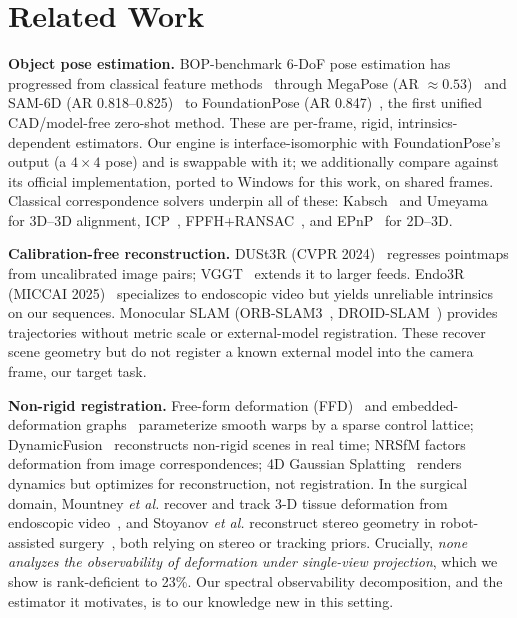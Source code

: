 \documentclass[9pt,twoside,web]{ieeecolor2}
\begin{document}
\section{Related Work}\label{sec:related}

\textbf{Object pose estimation.} BOP-benchmark 6-DoF pose estimation has progressed from classical feature methods~\cite{hodan2018bop} through MegaPose (AR $\approx0.53$)~\cite{labbe2022megapose} and SAM-6D (AR 0.818--0.825)~\cite{lin2024sam6d} to FoundationPose (AR 0.847)~\cite{wen2024foundationpose}, the first unified CAD/model-free zero-shot method. These are per-frame, rigid, intrinsics-dependent estimators. Our engine is interface-isomorphic with FoundationPose's output (a $4\times4$ pose) and is swappable with it; we additionally compare against its official implementation, ported to Windows for this work, on shared frames. Classical correspondence solvers underpin all of these: Kabsch~\cite{kabsch1976} and Umeyama~\cite{umeyama1991} for 3D--3D alignment, ICP~\cite{besl1992icp}, FPFH+RANSAC~\cite{rusu2009fpfh,fischler1981ransac}, and EPnP~\cite{lepetit2009epnp} for 2D--3D.

\textbf{Calibration-free reconstruction.} DUSt3R (CVPR 2024)~\cite{wang2024dust3r} regresses pointmaps from uncalibrated image pairs; VGGT~\cite{wang2025vggt} extends it to larger feeds. Endo3R (MICCAI 2025)~\cite{guo2025endo3r} specializes to endoscopic video but yields unreliable intrinsics on our sequences. Monocular SLAM (ORB-SLAM3~\cite{campos2021orbslam3}, DROID-SLAM~\cite{teed2021droidslam}) provides trajectories without metric scale or external-model registration. These recover scene geometry but do not register a known external model into the camera frame, our target task.

\textbf{Non-rigid registration.} Free-form deformation (FFD)~\cite{sederberg1986ffd,rueckert1999nonrigid} and embedded-deformation graphs~\cite{sumner2007embedded} parameterize smooth warps by a sparse control lattice; DynamicFusion~\cite{newcombe2015dynamicfusion} reconstructs non-rigid scenes in real time; NRSfM factors deformation from image correspondences; 4D Gaussian Splatting~\cite{wu20244dgs} renders dynamics but optimizes for reconstruction, not registration. In the surgical domain, Mountney \emph{et al.} recover and track 3-D tissue deformation from endoscopic video~\cite{mountney2010deformation}, and Stoyanov \emph{et al.} reconstruct stereo geometry in robot-assisted surgery~\cite{stoyanov2010stereo}, both relying on stereo or tracking priors. Crucially, \emph{none analyzes the observability of deformation under single-view projection}, which we show is rank-deficient to 23\%. Our spectral observability decomposition, and the estimator it motivates, is to our knowledge new in this setting.
\end{document}
